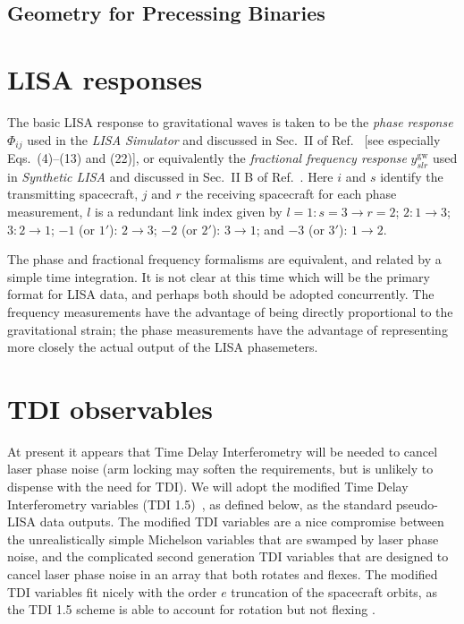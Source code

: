 \documentclass[11pt]{report}
\begin{document}
\subsection{Geometry for Precessing Binaries}

\section{LISA responses}
\label{sec:responses}

The basic LISA response to gravitational waves is taken to be the \emph{phase response} $\Phi_{ij}$ used in the
\emph{LISA Simulator} and discussed in Sec.\ II of Ref.\ \cite{cr2003} [see especially Eqs.\ (4)--(13) and (22)],
or equivalently the \emph{fractional frequency response} $y^\mathrm{gw}_{slr}$ used in \emph{Synthetic LISA} and
discussed in Sec.\ II B of Ref.\ \cite{vallis2005}. Here $i$ and $s$ identify the transmitting spacecraft, $j$
and $r$ the receiving spacecraft for each phase measurement, $l$ is a redundant link index given by
$l= 1: s = 3 \rightarrow r = 2$; 
$2: 1 \rightarrow 3$;
$3: 2 \rightarrow 1$;
$-1$ (or $1'$): $2 \rightarrow 3$;
$-2$ (or $2'$): $3 \rightarrow 1$; and
$-3$ (or $3'$): $1 \rightarrow 2$.

The phase and fractional frequency formalisms are equivalent, and related by a simple time integration.
It is not clear at this time which will be the primary format for LISA data, and perhaps both should be
adopted concurrently. The frequency measurements have the advantage of being directly proportional to the
gravitational strain; the phase measurements have the advantage of representing more closely the actual output
of the LISA phasemeters.  

\section{TDI observables}
\label{sec:tdi}

At present it appears that Time Delay Interferometry \cite{firstgen} will be needed to cancel laser phase
noise (arm locking may soften the requirements, but is unlikely to dispense with the need for TDI).
We will adopt the modified Time Delay Interferometry variables (TDI 1.5)~\cite{secondgen,modified},
as defined below, as the standard pseudo-LISA data outputs. The modified TDI variables are a nice compromise
between the unrealistically simple Michelson variables that are swamped by laser phase noise, and the complicated
second generation TDI variables
that are designed to cancel laser phase noise in an array that both rotates and flexes. The modified
TDI variables fit nicely with the order $e$ truncation of the spacecraft orbits, as the TDI 1.5 scheme is
able to account for rotation but not flexing \cite{modified}.
\end{document}

